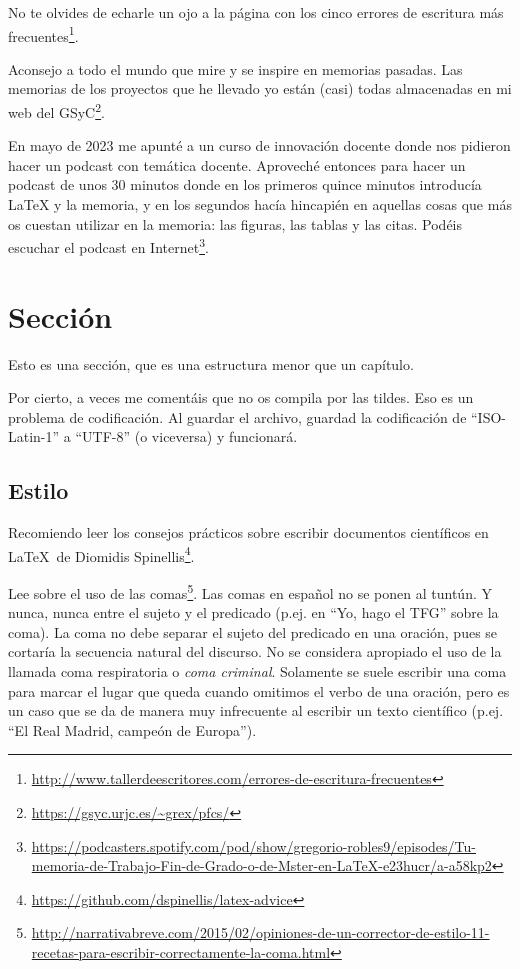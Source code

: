 \documentclass[a4paper, 12pt]{book}
\begin{document}
No te olvides de echarle un ojo a la página con los cinco errores de escritura más frecuentes\footnote{\url{http://www.tallerdeescritores.com/errores-de-escritura-frecuentes}}.

Aconsejo a todo el mundo que mire y se inspire en memorias pasadas.
Las memorias de los proyectos que he llevado yo están (casi) todas almacenadas en mi web del GSyC\footnote{\url{https://gsyc.urjc.es/~grex/pfcs/}}.

En mayo de 2023 me apunté a un curso de innovación docente donde nos pidieron hacer un podcast con temática docente. Aproveché entonces para hacer un podcast de unos 30 minutos donde en los primeros quince minutos introducía LaTeX y la memoria, y en los segundos hacía hincapién en aquellas cosas que más os cuestan utilizar en la memoria: las figuras, las tablas y las citas. Podéis escuchar el podcast en Internet\footnote{\url{https://podcasters.spotify.com/pod/show/gregorio-robles9/episodes/Tu-memoria-de-Trabajo-Fin-de-Grado-o-de-Mster-en-LaTeX-e23hucr/a-a58kp2}}.


\section{Sección}
\label{sec:seccion}

Esto es una sección, que es una estructura menor que un capítulo. 

Por cierto, a veces me comentáis que no os compila por las tildes.
Eso es un problema de codificación.
Al guardar el archivo, guardad la codificación de ``ISO-Latin-1'' a ``UTF-8'' (o viceversa) y funcionará.

\subsection{Estilo}
\label{subsec:estilo}

Recomiendo leer los consejos prácticos sobre escribir documentos científicos en \LaTeX \ de Diomidis Spinellis\footnote{\url{https://github.com/dspinellis/latex-advice}}.

Lee sobre el uso de las comas\footnote{\url{http://narrativabreve.com/2015/02/opiniones-de-un-corrector-de-estilo-11-recetas-para-escribir-correctamente-la-coma.html}}. 
Las comas en español no se ponen al tuntún.
Y nunca, nunca entre el sujeto y el predicado (p.ej. en ``Yo, hago el TFG'' sobre la coma).
La coma no debe separar el sujeto del predicado en una oración, pues se cortaría la secuencia natural del discurso.
No se considera apropiado el uso de la llamada coma respiratoria o \emph{coma criminal}.
Solamente se suele escribir una coma para marcar el lugar que queda cuando omitimos el verbo de una oración, pero es un caso que se da de manera muy infrecuente al escribir un texto científico (p.ej. ``El Real Madrid, campeón de Europa'').
\end{document}
